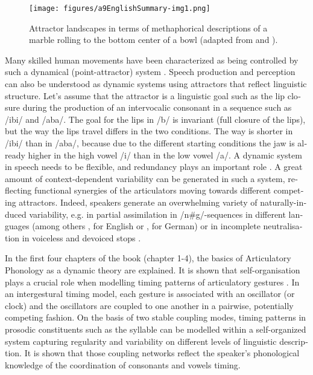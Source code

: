\begin{otherlanguage}{english}
\begin{figure}[htbp]
	\texttt{[image: figures/a9EnglishSummary-img1.png]}
		\caption{Attractor landscapes in terms of methaphorical descriptions of a marble rolling to the bottom center of a bowl (adapted from \citet{Nam2009b} and \citet{Mücke2014c}).}
		\label{fig:0801}
\end{figure}

Many skilled human movements have been characterized as being controlled by such a dynamical (point-attractor) system \citep{Goldstein2006}. Speech production and perception can also be understood as dynamic systems using attractors that reflect linguistic structure. Let’s assume that the attractor is a linguistic goal such as the lip closure during the production of an intervocalic consonant in a sequence such as /ibi/ and /aba/. The goal for the lips in /b/ is invariant (full closure of the lips), but the way the lips travel differs in the two conditions. The way is shorter in /ibi/ than in /aba/, because due to the different starting conditions the jaw is already higher in the high vowel /i/ than in the low vowel /a/. A dynamic system in speech needs to be flexible, and redundancy plays an important role \citep[see][]{Fowler1980, Saltzman1987, Saltzman1989, Browman1992a, Hawkins1992, Goldstein2014, Mücke2017}. A great amount of context-dependent variability can be generated in such a system, reflecting functional synergies of the articulators moving towards different competing attractors. Indeed, speakers generate an overwhelming variety of naturally-induced variability, e.g. in partial assimilation in /n\#g/-sequences in different languages (among others \citealt{Barry1991}, \citealt{Ellis2002} for English or \citealt{Mücke2008c}, \citealt{Bergmann2012} for German) or in incomplete neutralisation in voiceless and devoiced stops \citep{Röttger2014}.

In the first four chapters of the book (chapter 1-4), the basics of Articulatory Phonology as a dynamic theory are explained. It is shown that self-organisation plays a crucial role when modelling timing patterns of articulatory gestures \citep[see][]{Browman2000, Saltzman2000, Nam2003, Nam2007b, Goldstein2007a, Goldstein2007, Goldstein2009, Nam2009b, Shaw2009, Marin2010, Shaw2011, Pouplier2012, Hermes2013, Gafos2014, Hermes2017}. In an intergestural timing model, each gesture is associated with an oscillator (or clock) and the oscillators are coupled to one another in a pairwise, potentially competing fashion. On the basis of two stable coupling modes, timing patterns in prosodic constituents such as the syllable can be modelled within a self-organized system capturing regularity and variability on different levels of linguistic description. It is shown that those coupling networks reflect the speaker’s phonological knowledge of the coordination of consonants and vowels timing.


\end{otherlanguage}

